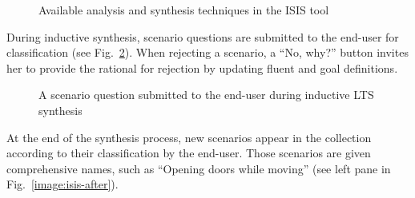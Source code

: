 \begin{figure}
\centering{}
  \caption{Available analysis and synthesis techniques in the ISIS tool\label{image:isis-tool-context}}
\end{figure}

During inductive synthesis, scenario questions are submitted to the end-user for classification (see Fig.~\ref{image:isis-tool-scenario-question}). When rejecting a scenario, a ``No, why?'' button invites her to provide the rational for rejection by updating fluent and goal definitions. 

\begin{figure}
\centering{}
  \caption{A scenario question submitted to the end-user during inductive LTS synthesis\label{image:isis-tool-scenario-question}}
\end{figure}

At the end of the synthesis process, new scenarios appear in the collection according to their classification by the end-user. Those scenarios are given comprehensive names, such as ``Opening doors while moving'' (see left pane in Fig.~\ref{image:isis-after}).

